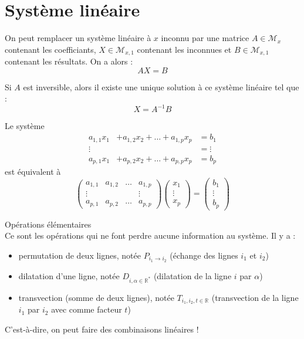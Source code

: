 \documentclass[a4paper, titlepage]{article}
\newenvironment{lititle}%
{\vspace{7mm}\LobsterTwo \large}%
{\\}
\begin{document}
	\section{Système linéaire}
	\begin{thm}
		On peut remplacer un système linéaire à $x$ inconnu par une matrice $A\in\mathcal{M}_{x}$ contenant les coefficiants, $X\in\mathcal{M}_{x,1}$ contenant les inconnues et $B\in\mathcal{M}_{x,1}$ contenant les résultats. On a alors :
		$$ AX=B $$

		Si $A$ est inversible, alors il existe une unique solution à ce système linéaire tel que :
		$$ X=A^{-1}B $$
	\end{thm}
	\begin{exemple}
		Le système 
		\begin{align*}
			a_{1,1}x_1 &+ a_{1,2}x_2 + \ldots + a_{1,p}x_p &= b_1\\
			\vdots& &= \vdots \\
			a_{p,1}x_1 &+ a_{p,2}x_2 + \ldots + a_{p,p}x_p &= b_p
		\end{align*}
		est équivalent à
		$$ \begin{pmatrix} a_{1,1}&a_{1,2}&\ldots&a_{1,p}\\\vdots&&&\vdots\\a_{p,1}&a_{p,2}&\ldots&a_{p,p} \end{pmatrix} \begin{pmatrix} x_1\\\vdots\\x_p \end{pmatrix} = \begin{pmatrix} b_1\\\vdots\\b_p \end{pmatrix}  $$
	\end{exemple}
	\begin{lititle}
		Opérations élémentaires
	\end{lititle}
	Ce sont les opérations qui ne font perdre aucune information au système. Il y a :
	\begin{itemize}
		\item permutation de deux lignes, notée $P_{i_1 \to i_2}$ (échange des lignes $i_1$ et $i_2$)
		\item dilatation d'une ligne, notée $D_{i,\alpha\in\mathbb{R}^*}$ (dilatation de la ligne $i$ par $\alpha$)
		\item transvection (somme de deux lignes), notée $T_{i_1,i_2,t\in\mathbb{R}}$ (transvection de la ligne $i_1$ par $i_2$ avec comme facteur $t$)
	\end{itemize}
	C'est-à-dire, on peut faire des combinaisons linéaires !
	
\end{document}
